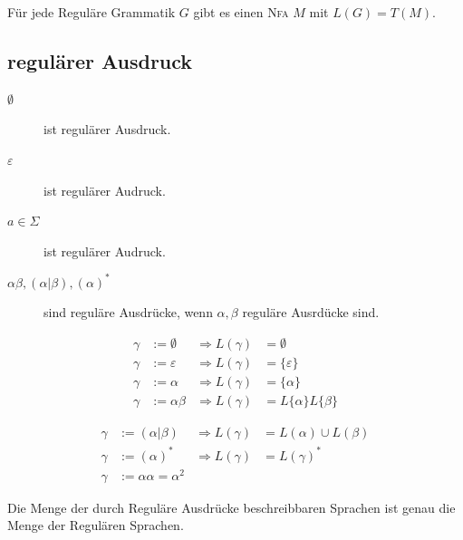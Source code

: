 \documentclass{scrartcl}
\begin{document}
\begin{shaded}
    Für jede Reguläre Grammatik $G$ gibt es einen \textsc{Nfa} $M$ mit $L(G)=T(M)$.
\end{shaded}

\subsection*{regulärer Ausdruck} %
\begin{description}
    \item[$\emptyset$] ist regulärer Ausdruck.
    \item[$\varepsilon$] ist regulärer Audruck.
    \item[$a\in\Sigma$] ist regulärer Audruck.
    \item[$\alpha\beta, \left(\alpha\vert\beta\right), \left(\alpha\right)^* $] sind reguläre Ausdrücke, wenn $\alpha,\beta$ reguläre Ausrdücke sind.
\end{description}

\begin{minipage}[t]{0.48\textwidth}
    \begin{align*}
        \gamma &:= \emptyset & \Rightarrow L(\gamma) &= \emptyset \\
        \gamma &:=\varepsilon & \Rightarrow L(\gamma) &= \{\varepsilon\} \\
        \gamma &:=\alpha & \Rightarrow L(\gamma) &= \{\alpha\} \\
        \gamma &:=\alpha\beta & \Rightarrow L(\gamma) &= L\{\alpha\}L\{\beta\}
    \end{align*}
\end{minipage}
\hfill \vrule \hfill
\begin{minipage}[t]{0.48\textwidth}
    \begin{align*}
        \gamma &:= \left(\alpha\vert\beta\right) & \Rightarrow L\left(\gamma\right)&=L(\alpha)\cup L(\beta) \\
        \gamma &:= \left(\alpha\right)^* & \Rightarrow L(\gamma) &= L(\gamma)^* \\
        \gamma &:= \alpha\alpha = \alpha^2
    \end{align*}
\end{minipage}

\begin{shaded}
    Die Menge der durch Reguläre Ausdrücke beschreibbaren Sprachen ist genau die Menge der Regulären Sprachen.
\end{shaded}
\end{document}
